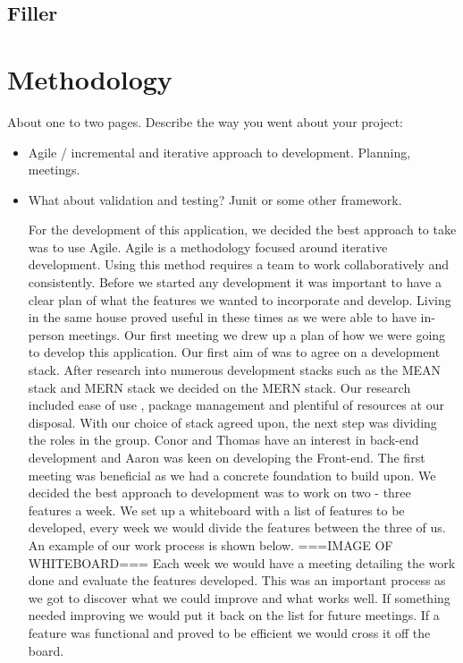 \section{Filler}


\chapter{Methodology}
About one to two pages.
Describe the way you went about your project:
\begin{itemize}
\item Agile / incremental and iterative approach to development. Planning, meetings.
\item What about validation and testing? Junit or some other framework.

For the development of this application, we decided the best approach to take was to use Agile. Agile is a methodology focused around iterative development. Using this method requires a team to work collaboratively and consistently. Before we started any development it was important to have a clear plan of what the features we wanted to incorporate and develop. Living in the same house proved useful in these times as we were able to have in-person meetings. Our first meeting we drew up a plan of how we were going to develop this application. Our first aim of was to agree on a development stack. After research into numerous development stacks such as the MEAN stack and MERN stack we decided on the MERN stack. Our research included ease of use , package management and plentiful of resources at our disposal. With our choice of stack agreed upon, the next step was dividing the roles in the group. Conor and Thomas have an interest in back-end development and Aaron was keen on developing the Front-end. The first meeting was beneficial as we had a concrete foundation to build upon. \newline
We decided the best approach to development was to work on two - three features a week. We set up a whiteboard with a list of features to be developed, every week we would divide the features between the three of us. An example of our work process is shown below.
===IMAGE OF WHITEBOARD===
Each week we would have a meeting detailing the work done and evaluate the features developed. This was an important process as we got to discover what we could improve and what works well. If something needed improving we would put it back on the list for future meetings. If a feature was functional and proved to be efficient we would cross it off the board. \newline

\end{itemize}
